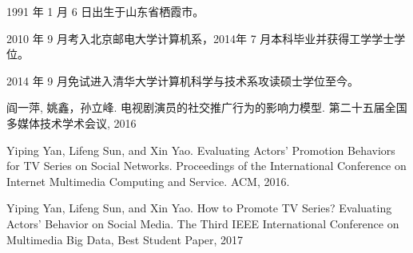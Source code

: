 \begin{resume}


  1991 年 1 月 6 日出生于山东省栖霞市。

  2010 年 9 月考入北京邮电大学计算机系，2014年 7 月本科毕业并获得工学学士学位。

  2014 年 9 月免试进入清华大学计算机科学与技术系攻读硕士学位至今。

  \begin{publications}
  \item 阎一萍, 姚鑫，孙立峰. 电视剧演员的社交推广行为的影响力模型. 第二十五届全国多媒体技术学术会议, 2016
  \item Yiping Yan, Lifeng Sun, and Xin Yao. Evaluating Actors' Promotion Behaviors for TV Series on Social Networks. Proceedings of the International Conference on Internet Multimedia Computing and Service. ACM, 2016.
  \item Yiping Yan, Lifeng Sun, and Xin Yao. How to Promote TV Series? Evaluating Actors’ Behavior on Social Media. The Third IEEE International Conference on Multimedia Big Data, Best Student Paper, 2017
  \end{publications}

\end{resume}
